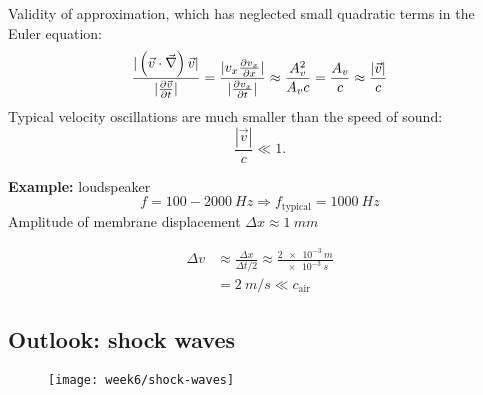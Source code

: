 Validity of approximation, which has neglected small quadratic terms in the Euler equation:
\begin{align}
\frac{|\left(\vec{v}\cdot\vec{\nabla}\right)\vec{v}|}{|\frac{\partial \vec{v}}{\partial t}|} = \frac{|v_x\frac{\partial v_x}{\partial x}|}{|\frac{\partial v_x}{\partial t}|} \approx \frac{A_v^2}{A_vc} = \frac{A_v}{c} \approx \frac{|\vec{v}|}{c}
\end{align}
Typical velocity oscillations are much smaller than the speed of sound:
\begin{equation}
\frac{|\vec{v}|}{c} \ll 1.
\end{equation}
\begin{framed}
\textbf{Example:} loudspeaker
\begin{equation}
f=100-\SI{2000}{Hz} \Rightarrow f_\mathrm{typical} = \SI{1000}{Hz}
\end{equation}
Amplitude of membrane displacement $\Delta x \approx \SI{1}{mm}$

\begin{align}
\Delta v &\approx \frac{\Delta x}{\Delta t/2} \approx \frac{\SI{2e-3}{m}}{\SI{e-3}{s}} \\
 &= \SI{2}{m/s} \ll c_\mathrm{air}
\end{align}
\end{framed}

\newpage
\subsection{Outlook: shock waves}
\begin{figure}[!h]
    \centering
    \texttt{[image: week6/shock-waves]}\\
    \caption{}
    \label{fig:shock-waves}
\end{figure}